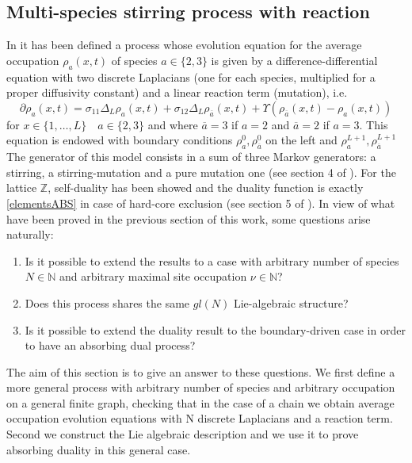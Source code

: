 \documentclass[10pt]{article}
\numberwithin{equation}{section}
\numberwithin{equation}{subsection}
\begin{document}
\subsection{Multi-species stirring process with reaction}
In \cite{casini2022uphill} it has been defined a process whose evolution equation for the average occupation $\rho_{a}(x,t)$ of species $a\in \{2,3\}$ is given by a difference-differential equation with two discrete Laplacians (one for each species, multiplied for a proper diffusivity constant) and a linear reaction term (mutation), i.e.
\begin{equation}\label{2SpeciesRD}
	\partial \rho_{a}(x,t)=\sigma_{11}\Delta_{L}\rho_{a}(x,t)+\sigma_{12}\Delta_{L}\rho_{\overline{a}}(x,t)+\Upsilon\left(\rho_{\overline{a}}(x,t)-\rho_{a}(x,t)\right)
\end{equation} 
for $ x\in\{1,\ldots,L\}\quad a\in\{2,3\}$  and where $\overline{a}=3$ if $a=2$ and $\overline{a}=2$ if $a=3$.
This equation is endowed with boundary conditions $\rho_{a}^{0},\rho_{\overline{a}}^{0}$ on the left and $\rho_{a}^{L+1},\rho_{\overline{a}}^{L+1}$ \\The generator of this model consists in a sum of three Markov generators: a stirring, a stirring-mutation and a pure mutation one (see section 4 of \cite{casini2022uphill}). For the lattice $\mathbb{Z}$, self-duality has been showed and the duality function is exactly \eqref{elementsABS} in case of hard-core exclusion (see section 5 of \cite{casini2022uphill}). In view of what have been proved in the previous section of this work, some questions arise naturally:
\begin{enumerate}
		\item Is it possible to extend the results to a case with arbitrary number of species $N\in \mathbb{N}$ and arbitrary maximal site occupation $\nu\in \mathbb{N}$?
			\item Does this process shares the same $gl(N)$ Lie-algebraic structure?
	\item Is it possible to extend the duality result to the boundary-driven case in order to have an absorbing dual process?
\end{enumerate}
The aim of this section is to give an answer to these questions. We first define a more general process with arbitrary number of species and arbitrary occupation on a general finite graph, checking that in the case of a chain we obtain average occupation evolution equations with N discrete Laplacians and a reaction term. Second we construct the Lie algebraic description and we use it to prove absorbing duality in this general case. 
\end{document}
